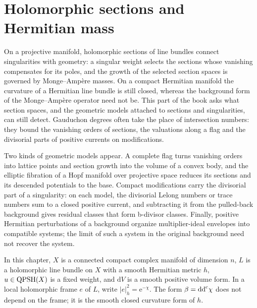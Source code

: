 \chapter{Holomorphic sections and Hermitian mass}
\label{chap:sections}

On a projective manifold, holomorphic sections of line bundles connect singularities with geometry: a singular weight selects the sections whose vanishing compensates for its poles, and the growth of the selected section spaces is governed by Monge--Amp\`ere masses. On a compact Hermitian manifold the curvature of a Hermitian line bundle is still closed, whereas the background form of the Monge--Amp\`ere operator need not be. This part of the book asks what section spaces, and the geometric models attached to sections and singularities, can still detect. Gauduchon degrees often take the place of intersection numbers: they bound the vanishing orders of sections, the valuations along a flag and the divisorial parts of positive currents on modifications.

Two kinds of geometric models appear. A complete flag turns vanishing orders into lattice points and section growth into the volume of a convex body, and the elliptic fibration of a Hopf manifold over projective space reduces its sections and its descended potentials to the base. Compact modifications carry the divisorial part of a singularity: on each model, the divisorial Lelong numbers or trace numbers sum to a closed positive current, and subtracting it from the pulled-back background gives residual classes that form b-divisor classes. Finally, positive Hermitian perturbations of a background organize multiplier-ideal envelopes into compatible systems; the limit of such a system in the original background need not recover the system.

In this chapter, $X$ is a connected compact complex manifold of dimension $n$, $L$ is a holomorphic line bundle on $X$ with a smooth Hermitian metric $h$, $u\in\mathrm{QPSH}(X)$ is a fixed weight, and $\mathrm{d}V$ is a smooth positive volume form. In a local holomorphic frame $e$ of $L$, write $|e|_h^2=\mathrm{e}^{-\chi}$. The form $\beta=\mathrm{dd}^{\mathrm{c}}\chi$ does not depend on the frame; it is the smooth closed curvature form of $h$.

